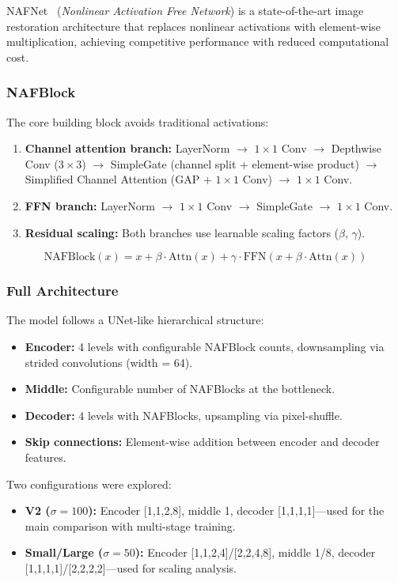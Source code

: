 \medskip

NAFNet~\cite{nafnet} (\textit{Nonlinear Activation Free Network}) is a state-of-the-art image restoration architecture that replaces nonlinear activations with element-wise multiplication, achieving competitive performance with reduced computational cost.

\subsubsection{NAFBlock}
The core building block avoids traditional activations:
\begin{enumerate}
    \item \textbf{Channel attention branch:} LayerNorm $\to$ $1\!\times\!1$ Conv $\to$ Depthwise Conv ($3\!\times\!3$) $\to$ SimpleGate (channel split + element-wise product) $\to$ Simplified Channel Attention (GAP + $1\!\times\!1$ Conv) $\to$ $1\!\times\!1$ Conv.
    \item \textbf{FFN branch:} LayerNorm $\to$ $1\!\times\!1$ Conv $\to$ SimpleGate $\to$ $1\!\times\!1$ Conv.
    \item \textbf{Residual scaling:} Both branches use learnable scaling factors ($\beta$, $\gamma$).
\end{enumerate}
\begin{equation}
\text{NAFBlock}(x) = x + \beta \cdot \text{Attn}(x) + \gamma \cdot \text{FFN}(x + \beta \cdot \text{Attn}(x))
\end{equation}

\subsubsection{Full Architecture}
The model follows a UNet-like hierarchical structure:
\begin{itemize}
    \item \textbf{Encoder:} 4 levels with configurable NAFBlock counts, downsampling via strided convolutions (width = 64).
    \item \textbf{Middle:} Configurable number of NAFBlocks at the bottleneck.
    \item \textbf{Decoder:} 4 levels with NAFBlocks, upsampling via pixel-shuffle.
    \item \textbf{Skip connections:} Element-wise addition between encoder and decoder features.
\end{itemize}

Two configurations were explored:
\begin{itemize}
    \item \textbf{V2 ($\sigma\!=\!100$):} Encoder [1,1,2,8], middle 1, decoder [1,1,1,1]---used for the main comparison with multi-stage training.
    \item \textbf{Small/Large ($\sigma\!=\!50$):} Encoder [1,1,2,4]/[2,2,4,8], middle 1/8, decoder [1,1,1,1]/[2,2,2,2]---used for scaling analysis.
\end{itemize}

